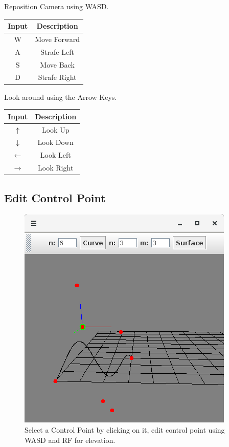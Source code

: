 \documentclass{article}
\begin{document}
Reposition Camera using WASD.

\begin{table}[ht!]
  \centering
  \begin{tabular}{||c c||}
    \hline
    Input & Description \\
    \hline
    \hline
    W & Move Forward \\
    \hline
    A & Strafe Left  \\
    \hline
    S & Move Back \\
    \hline
    D & Strafe Right \\
    \hline
  \end{tabular}
\end{table}

Look around using the Arrow Keys.

\begin{table}[ht!]
  \centering
  \begin{tabular}{||c c||}
    \hline
    Input & Description \\
    \hline
    \hline
    $\uparrow$ & Look Up \\
    \hline
    $\downarrow$ & Look Down \\
    \hline
    $\leftarrow$ & Look Left  \\
    \hline
    $\rightarrow$ & Look Right \\
    \hline
  \end{tabular}
\end{table}

\subsection{Edit Control Point}

\begin{figure}[!htb]
  \caption{Select a Control Point by clicking on it, edit control point using WASD and RF for elevation. }
  \centering
  \includegraphics[scale=0.38]{images/image5.png}
\end{figure}
\end{document}

